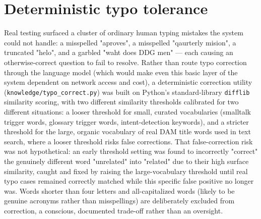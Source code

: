 \section{Deterministic typo tolerance}
Real testing surfaced a cluster of ordinary human typing mistakes the system could not handle: a misspelled "aproves", a misspelled "qaurterly mision", a truncated "helo", and a garbled "waht does DDG men" — each causing an otherwise-correct question to fail to resolve. Rather than route typo correction through the language model (which would make even this basic layer of the system dependent on network access and cost), a deterministic correction utility (\texttt{knowledge/\allowbreak{}typo\_\allowbreak{}correct.py}) was built on Python's standard-library \texttt{difflib} similarity scoring, with two different similarity thresholds calibrated for two different situations: a looser threshold for small, curated vocabularies (smalltalk trigger words, glossary trigger words, intent-detection keywords), and a stricter threshold for the large, organic vocabulary of real DAM title words used in text search, where a looser threshold risks false corrections. That false-correction risk was not hypothetical: an early threshold setting was found to incorrectly "correct" the genuinely different word "unrelated" into "related" due to their high surface similarity, caught and fixed by raising the large-vocabulary threshold until real typo cases remained correctly matched while this specific false positive no longer was. Words shorter than four letters and all-capitalized words (likely to be genuine acronyms rather than misspellings) are deliberately excluded from correction, a conscious, documented trade-off rather than an oversight.

